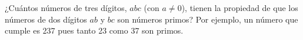 ¿Cuántos números de tres dígitos, $abc$ (con $a \neq 0$), tienen la propiedad de que los números de dos dígitos $ab$ y $bc$ son números primos? Por ejemplo, un número que cumple es 237 pues tanto 23 como 37 son primos.